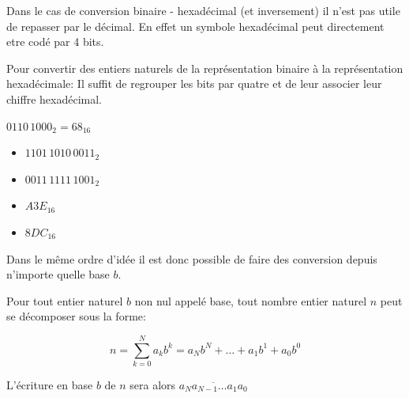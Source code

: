 	\begin{exercice_cours}{}
	\vspace{2cm}
	\end{exercice_cours}

	\begin{propriete}{}
		Dans le cas de conversion binaire - hexadécimal (et inversement) il n'est pas utile de repasser par le décimal. En effet un symbole hexadécimal peut directement etre codé par 4 bits.

		Pour convertir des entiers naturels de la représentation binaire à la représentation hexadécimale: Il suffit de regrouper les bits par quatre et de leur associer leur chiffre hexadécimal.
		
		$0110\,1000_2 = 68_{16}$
	\end{propriete}


	\begin{minipage}{0.49\linewidth}
		
	\begin{exercice_cours}{}
		\begin{itemize}
			\item $1101\,1010\,0011_2$
			\item $0011\,1111\,1001_2$
		\end{itemize}
	\end{exercice_cours}	\end{minipage}
\hfill
	\begin{minipage}{0.49\linewidth}
		\begin{exercice_cours}{}
		\begin{itemize}
			\item $A3E_{16}$
			\item $8DC_{16}$
		\end{itemize}
	\end{exercice_cours}
	\end{minipage}
	
\begin{propriete}{}
	Dans le même ordre d'idée il est donc possible de faire des conversion depuis n'importe quelle base $b$.

	\bigskip
	
	Pour tout entier naturel $b$ non nul appelé base, tout nombre entier naturel $n$ peut se décomposer sous la forme:
	
	$$n=\sum_{k = 0}^{N} a_kb^k=a_Nb^N+ \ldots + a_1b^1+a_0b^0$$
	
	L'écriture en base $b$ de $n$ sera alors $\overline{a_Na_{N-1} \ldots a_1a_0}$
	
\end{propriete}


